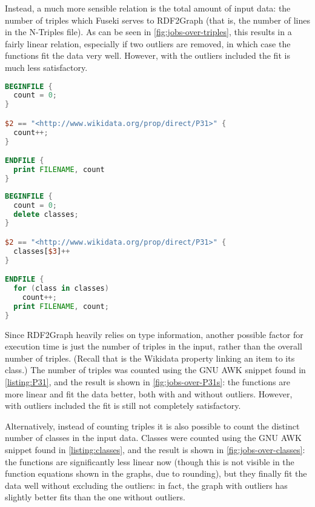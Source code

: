 Instead, a much more sensible relation is the total amount of input data:
the number of \glspl{triple} which Fuseki serves to \gls{RDF2Graph}
(that is, the number of lines in the \gls{N-Triples} file).
As can be seen in \cref{fig:jobs-over-triples},
this results in a fairly linear relation,
especially if two outliers are removed,
in which case the functions fit the data very well.
However, with the outliers included the fit is much less satisfactory.

\begin{listing}[b]
\begin{lstlisting}[language=awk]
BEGINFILE {
  count = 0;
}

$2 == "<http://www.wikidata.org/prop/direct/P31>" {
  count++;
}

ENDFILE {
  print FILENAME, count
}
\end{lstlisting}
\caption{GNU AWK script to count the number of  triples in the input}
\label{listing:P31}
\end{listing}

\begin{listing}[b]
\begin{lstlisting}[language=awk]
BEGINFILE {
  count = 0;
  delete classes;
}

$2 == "<http://www.wikidata.org/prop/direct/P31>" {
  classes[$3]++
}

ENDFILE {
  for (class in classes)
    count++;
  print FILENAME, count;
}
\end{lstlisting}
\caption{GNU AWK script to count distinct classes in the input}
\label{listing:classes}
\end{listing}

Since \gls{RDF2Graph} heavily relies on type information,
another possible factor for execution time
is just the number of  \glspl{triple} in the input,
rather than the overall number of \glspl{triple}.
(Recall that  is the \gls{Wikidata} property linking an \gls{item} to its class.)
The number of  \glspl{triple} was counted
using the GNU AWK snippet found in \cref{listing:P31},
and the result is shown in \cref{fig:jobs-over-P31s}:
the functions are more linear and fit the data better, both with and without outliers.
However, with outliers included the fit is still not completely satisfactory.

Alternatively, instead of counting  \glspl{triple}
it is also possible to count the distinct number of classes in the input data.
Classes were counted using the GNU AWK snippet found in \cref{listing:classes},
and the result is shown in \cref{fig:jobs-over-classes}:
the functions are significantly less linear now
(though this is not visible in the function equations shown in the graphs, due to rounding),
but they finally fit the data well without excluding the outliers:
in fact, the graph with outliers has slightly better fits than the one without outliers.

